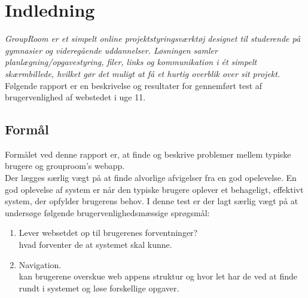 \documentclass[12pt]{article}
\begin{document}
\section{Indledning}
\textit{
GroupRoom er et simpelt online projektstyringsværktøj designet til studerende på gymnasier og
videregående uddannelser. Løsningen samler planlægning/opgavestyring, filer, links og kommunikation i ét simpelt skærmbillede, hvilket gør det muligt at få et hurtig overblik over sit projekt.}\cite[p.27]{Kursus}\\
Følgende rapport er en beskrivelse og resultater for gennemført test af brugervenlighed af webstedet i uge 11.
\subsection{Formål}
Formålet ved denne rapport er, at finde og beskrive problemer mellem typiske brugere og grouproom's webapp. \\
Der lægges særlig vægt på at finde alvorlige afvigelser fra en god opelevelse. En god oplevelse af system er når den typiske brugere oplever et behageligt, effektivt system, der opfylder brugerens behov. I denne test er der lagt særlig vægt på at undersøge følgende brugervenlighedsmæssige sprøgsmål:
\begin{enumerate}
  \item Lever websetdet op til brugerenes forventninger? \\
        hvad forventer de at systemet skal kunne.
  \item Navigation. \\
        kan brugerene overskue web appens struktur og hvor let har de ved at finde rundt i systemet og løse forskellige opgaver.
\end{enumerate}
\end{document}
